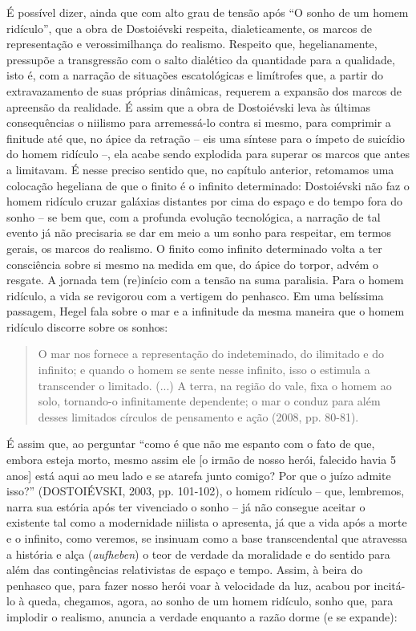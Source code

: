 É possível dizer, ainda que com alto grau de tensão após ``O sonho de um
homem ridículo'', que a obra de Dostoiévski respeita, dialeticamente, os
marcos de representação e verossimilhança do realismo. Respeito que,
hegelianamente, pressupõe a transgressão com o salto dialético da
quantidade para a qualidade, isto é, com a narração de situações
escatológicas e limítrofes que, a partir do extravazamento de suas
próprias dinâmicas, requerem a expansão dos marcos de apreensão da
realidade. É assim que a obra de Dostoiévski leva às últimas
consequências o niilismo para arremessá-lo contra si mesmo, para
comprimir a finitude até que, no ápice da retração -- eis uma síntese
para o ímpeto de suicídio do homem ridículo --, ela acabe sendo
explodida para superar os marcos que antes a limitavam. É nesse preciso
sentido que, no capítulo anterior, retomamos uma colocação hegeliana de
que o finito é o infinito determinado: Dostoiévski não faz o homem
ridículo cruzar galáxias distantes por cima do espaço e do tempo fora do
sonho -- se bem que, com a profunda evolução tecnológica, a narração de
tal evento já não precisaria se dar em meio a um sonho para respeitar,
em termos gerais, os marcos do realismo. O finito como infinito
determinado volta a ter consciência sobre si mesmo na medida em que, do
ápice do torpor, advém o resgate. A jornada tem (re)início com a tensão
na suma paralisia. Para o homem ridículo, a vida se revigorou com a
vertigem do penhasco. Em uma belíssima passagem, Hegel fala sobre o mar
e a infinitude da mesma maneira que o homem ridículo discorre sobre os
sonhos:

\begin{quote}
O mar nos fornece a representação do indeteminado, do ilimitado e do
infinito; e quando o homem se sente nesse infinito, isso o estimula a
transcender o limitado. (...) A terra, na região do vale, fixa o homem
ao solo, tornando-o infinitamente dependente; o mar o conduz para além
desses limitados círculos de pensamento e ação (2008, pp. 80-81).
\end{quote}

É assim que, ao perguntar ``como é que não me espanto com o fato de que,
embora esteja morto, mesmo assim ele {[}o irmão de nosso herói, falecido
havia 5 anos{]} está aqui ao meu lado e se atarefa junto comigo? Por que
o juízo admite isso?'' (DOSTOIÉVSKI, 2003, pp. 101-102), o homem
ridículo -- que, lembremos, narra sua estória após ter vivenciado o
sonho -- já não consegue aceitar o existente tal como a modernidade
niilista o apresenta, já que a vida após a morte e o infinito, como
veremos, se insinuam como a base transcendental que atravessa a história
e alça (\emph{aufheben}) o teor de verdade da moralidade e do sentido
para além das contingências relativistas de espaço e tempo. Assim, à
beira do penhasco que, para fazer nosso herói voar à velocidade da luz,
acabou por incitá-lo à queda, chegamos, agora, ao sonho de um homem
ridículo, sonho que, para implodir o realismo, anuncia a verdade
enquanto a razão dorme (e se expande):

